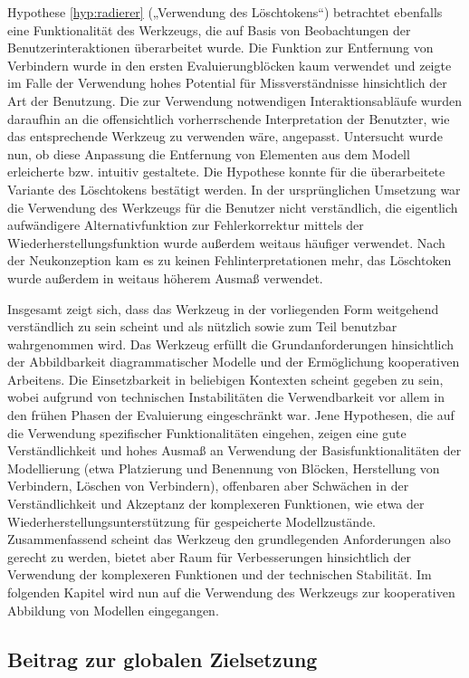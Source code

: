 Hypothese \ref{hyp:radierer} („Verwendung des Löschtokens“) betrachtet ebenfalls eine Funktionalität des Werkzeugs, die auf Basis von Beobachtungen der Benutzerinteraktionen überarbeitet wurde. Die Funktion zur Entfernung von Verbindern wurde in den ersten Evaluierungblöcken kaum verwendet und zeigte im Falle der Verwendung hohes Potential für Missverständnisse hinsichtlich der Art der Benutzung. Die zur Verwendung notwendigen Interaktionsabläufe wurden daraufhin an die offensichtlich vorherrschende Interpretation der Benutzter, wie das entsprechende Werkzeug zu verwenden wäre, angepasst. Untersucht wurde nun, ob diese Anpassung die Entfernung von Elementen aus dem Modell erleicherte bzw. intuitiv gestaltete. Die Hypothese konnte für die überarbeitete Variante des Löschtokens bestätigt werden. In der ursprünglichen Umsetzung war die Verwendung des Werkzeugs für die Benutzer nicht verständlich, die eigentlich aufwändigere Alternativfunktion zur Fehlerkorrektur mittels der Wiederherstellungsfunktion wurde außerdem weitaus häufiger verwendet. Nach der Neukonzeption kam es zu keinen Fehlinterpretationen mehr, das Löschtoken wurde außerdem in weitaus höherem Ausmaß verwendet.

Insgesamt zeigt sich, dass das Werkzeug in der vorliegenden Form weitgehend verständlich zu sein scheint und als nützlich sowie zum Teil benutzbar wahrgenommen wird. Das Werkzeug erfüllt die Grundanforderungen hinsichtlich der Abbildbarkeit diagrammatischer Modelle und der Ermöglichung kooperativen Arbeitens. Die Einsetzbarkeit in beliebigen Kontexten scheint gegeben zu sein, wobei aufgrund von technischen Instabilitäten die Verwendbarkeit vor allem in den frühen Phasen der Evaluierung eingeschränkt war. Jene Hypothesen, die auf die Verwendung spezifischer Funktionalitäten eingehen, zeigen eine gute Verständlichkeit und hohes Ausmaß an Verwendung der Basisfunktionalitäten der Modellierung (etwa Platzierung und Benennung von Blöcken, Herstellung von Verbindern, Löschen von Verbindern), offenbaren aber Schwächen in der Verständlichkeit und Akzeptanz der komplexeren Funktionen, wie etwa der Wiederherstellungsunterstützung für gespeicherte Modellzustände. Zusammenfassend scheint das Werkzeug den grundlegenden Anforderungen also gerecht zu werden, bietet aber Raum für Verbesserungen hinsichtlich der Verwendung der komplexeren Funktionen und der technischen Stabilität. Im folgenden Kapitel wird nun auf die Verwendung des Werkzeugs zur kooperativen Abbildung von Modellen eingegangen. 

\subsection{Beitrag zur globalen Zielsetzung}


